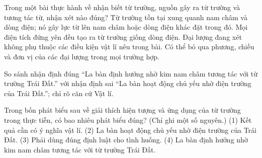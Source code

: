 \begin{ex}
Trong một bài thực hành về nhận biết từ trường, nguồn gây ra từ trường và tương tác từ, nhận xét nào đúng?
\choice
{\True Từ trường tồn tại xung quanh nam châm và dòng điện; nó gây lực từ lên nam châm hoặc dòng điện khác đặt trong đó.}
{Mọi điện tích đứng yên đều tạo ra từ trường giống dòng điện.}
{Đại lượng đang xét không phụ thuộc các điều kiện vật lí nêu trong bài.}
{Có thể bỏ qua phương, chiều và đơn vị của các đại lượng trong mọi trường hợp.}
\end{ex}

\begin{bt}
So sánh nhận định đúng “La bàn định hướng nhờ kim nam châm tương tác với từ trường Trái Đất.” với nhận định sai “La bàn hoạt động chủ yếu nhờ điện trường của Trái Đất.”; chỉ rõ căn cứ Vật lí.
\end{bt}

\begin{ex}
Trong bốn phát biểu sau về giải thích hiện tượng và ứng dụng của từ trường trong thực tiễn, có bao nhiêu phát biểu đúng? (Chỉ ghi một số nguyên.) (1) Kết quả cần có ý nghĩa vật lí. (2) La bàn hoạt động chủ yếu nhờ điện trường của Trái Đất. (3) Phải dùng đúng định luật cho tình huống. (4) La bàn định hướng nhờ kim nam châm tương tác với từ trường Trái Đất.
\end{ex}


